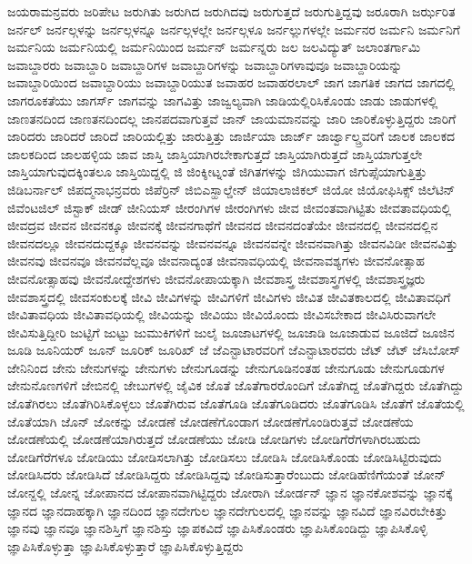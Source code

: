 {ಜಯರಾಮನ್ರವರು
ಜರಿಪೇಟ
ಜರುಗಿತು
ಜರುಗಿದ
ಜರುಗಿದವು
ಜರುಗುತ್ತದೆ
ಜರುಗುತ್ತಿದ್ದವು
ಜರೂರಾಗಿ
ಜರ್ಝರಿತ
ಜರ್ನಲ್
ಜರ್ನಲ್ಗಳನ್ನು
ಜರ್ನಲ್ಗಳನ್ನೂ
ಜರ್ನಲ್ಗಳಲ್ಲೇ
ಜರ್ನಲ್ಗಳೂ
ಜರ್ನಲ್ಲುಗಳಲ್ಲೇ
ಜರ್ಮನರ
ಜರ್ಮನಿ
ಜರ್ಮನಿಗೆ
ಜರ್ಮನಿಯ
ಜರ್ಮನಿಯಲ್ಲಿ
ಜರ್ಮನಿಯಿಂದ
ಜರ್ಮನ್
ಜರ್ಮನ್ನರು
ಜಲ
ಜಲವಿದ್ಯುತ್
ಜಲಾಂತರ್ಗಾಮಿ
ಜವಾಬ್ದಾರರು
ಜವಾಬ್ದಾರಿ
ಜವಾಬ್ದಾರಿಗಳ
ಜವಾಬ್ದಾರಿಗಳನ್ನು
ಜವಾಬ್ದಾರಿಗಳಾವುವೂ
ಜವಾಬ್ದಾರಿಯನ್ನು
ಜವಾಬ್ದಾರಿಯಿಂದ
ಜವಾಬ್ದಾರಿಯು
ಜವಾಬ್ದಾರಿಯುತ
ಜವಾಹರ
ಜವಾಹರಲಾಲ್
ಜಾಗ
ಜಾಗತಿಕ
ಜಾಗದ
ಜಾಗದಲ್ಲಿ
ಜಾಗರೂಕತೆಯು
ಜಾಗರ್ಸ್
ಜಾಗವನ್ನು
ಜಾಗವಿತ್ತು
ಜಾಜ್ವಲ್ಯವಾಗಿ
ಜಾಡಿಯಲ್ಲಿರಿಸಿಕೊಂಡು
ಜಾಡು
ಜಾಡುಗಳಲ್ಲಿ
ಜಾಣತನದಿಂದ
ಜಾಣತನದಿಂದಲ್ಲ
ಜಾನಪದವಾಗುತ್ತವೆ
ಜಾನ್
ಜಾಯಮಾನವನ್ನು
ಜಾರಿ
ಜಾರಿಕೊಳ್ಳುತ್ತಿದ್ದರು
ಜಾರಿಗೆ
ಜಾರಿದರು
ಜಾರಿದರೆ
ಜಾರಿದೆ
ಜಾರಿಯಲ್ಲಿತ್ತು
ಜಾರುತ್ತಿತ್ತು
ಜಾರ್ಜಿಯಾ
ಜಾರ್ಜ್
ಜಾರ್ಜ್ವಾಲ್ಡ್ರವರಿಗೆ
ಜಾಲಕ
ಜಾಲಕದ
ಜಾಲಕದಿಂದ
ಜಾಲಹಳ್ಳಿಯ
ಜಾವ
ಜಾಸ್ತಿ
ಜಾಸ್ತಿಯಾಗಿರಬೇಕಾಗುತ್ತದೆ
ಜಾಸ್ತಿಯಾಗಿರುತ್ತದೆ
ಜಾಸ್ತಿಯಾಗುತ್ತಲೇ
ಜಾಸ್ತಿಯಾಗುವುದಕ್ಕಿಂತಲೂ
ಜಾಸ್ತಿಯಿದ್ದಲ್ಲಿ
ಜಿ
ಜಿಂಕ್ಶೀಟ್ನಂತೆ
ಜಿಗಿತಗಳನ್ನು
ಜಿಗಿಯುವಾಗ
ಜಿಗುಪ್ಸೆಯಾಗುತ್ತಿತ್ತು
ಜಿಡಿಬರ್ನಾಲ್
ಜಿಪದ್ಮನಾಭನ್ರವರು
ಜಿಪೆರ್ರಿನ್
ಜಿಬಿಎಸ್ಹಾಲ್ಡೇನ್
ಜಿಯಾಲಾಜಿಕಲ್
ಜಿಯೋ
ಜಿಯೋಫಿಸಿಕ್ಸ್
ಜಿಲೆಟಿನ್
ಜಿವೆಂಟಜಿಲ್
ಜಿಸ್ಟಾಕ್
ಜೀಡ್
ಜೀನಿಯಸ್
ಜೀರಂಗಿಗಳ
ಜೀರಂಗಿಗಳು
ಜೀವ
ಜೀವಂತವಾಗಿಟ್ಟಿತು
ಜೀವತಾವಧಿಯಲ್ಲಿ
ಜೀವದ್ರವ
ಜೀವನ
ಜೀವನಕ್ಕೂ
ಜೀವನಕ್ಕೆ
ಜೀವನಗಾಥೆಗೆ
ಜೀವನದ
ಜೀವನದಂತೆಯೇ
ಜೀವನದಲ್ಲಿ
ಜೀವನದಲ್ಲಿನ
ಜೀವನದಲ್ಲೂ
ಜೀವನದುದ್ದಕ್ಕೂ
ಜೀವನವನ್ನು
ಜೀವನವನ್ನೂ
ಜೀವನವನ್ನೇ
ಜೀವನವಾಗಿತ್ತು
ಜೀವನವಿಡೀ
ಜೀವನವಿತ್ತು
ಜೀವನವು
ಜೀವನವೂ
ಜೀವನವೆಲ್ಲವೂ
ಜೀವನಾದ್ಯಂತ
ಜೀವನಾವಧಿಯಲ್ಲಿ
ಜೀವನಾವಶ್ಯಗಳು
ಜೀವನೋತ್ಸಾಹ
ಜೀವನೋತ್ಸಾಹವು
ಜೀವನೋದ್ದೇಶಗಳು
ಜೀವನೋಪಾಯಕ್ಕಾಗಿ
ಜೀವಶಾಸ್ತ್ರ
ಜೀವಶಾಸ್ತ್ರಗಳಲ್ಲಿ
ಜೀವಶಾಸ್ತ್ರಜ್ಞರು
ಜೀವಶಾಸ್ತ್ರದಲ್ಲಿ
ಜೀವಸಂಕುಲಕ್ಕೆ
ಜೀವಿ
ಜೀವಿಗಳನ್ನು
ಜೀವಿಗಳಿಗೆ
ಜೀವಿಗಳು
ಜೀವಿತ
ಜೀವಿತಕಾಲದಲ್ಲಿ
ಜೀವಿತಾವಧಿಗೆ
ಜೀವಿತಾವಧಿಯ
ಜೀವಿತಾವಧಿಯಲ್ಲಿ
ಜೀವಿಯನ್ನು
ಜೀವಿಯು
ಜೀವಿಯೊಂದು
ಜೀವಿಸಬೇಕಾದ
ಜೀವಿಸಿರುವಾಗಲೇ
ಜೀವಿಸುತ್ತಿದ್ದೀರಿ
ಜುಟ್ಟಿಗೆ
ಜುಟ್ಟು
ಜುಮುಕಿಗಳಿಗೆ
ಜುಲೈ
ಜೂಜಾಟಗಳಲ್ಲಿ
ಜೂಜಾಡಿ
ಜೂಜಾಡುವ
ಜೂಜಿದೆ
ಜೂಜಿನ
ಜೂಡಿ
ಜೂನಿಯರ್
ಜೂನ್
ಜೂರಿಕ್
ಜೂರಿಖ್
ಜೆ
ಜೆಎನ್ಟಾಟಾರವರಿಗೆ
ಜೆಎನ್ಟಾಟಾರವರು
ಜೆಟ್
ಜೆಟ್
ಜೆಸಿಬೋಸ್
ಜೇನಿನಿಂದ
ಜೇನು
ಜೇನುಗಳನ್ನು
ಜೇನುಗಳು
ಜೇನುಗೂಡನ್ನು
ಜೇನುಗೂಡಿನಂತಹ
ಜೇನುಗೂಡು
ಜೇನುಗೂಡುಗಳ
ಜೇನುನೊಣಗಳಿಗೆ
ಜೇಬಿನಲ್ಲಿ
ಜೇಬುಗಳಲ್ಲಿ
ಜೈವಿಕ
ಜೊತೆ
ಜೊತೆಗಾರರೊಂದಿಗೆ
ಜೊತೆಗಿದ್ದ
ಜೊತೆಗಿದ್ದರು
ಜೊತೆಗಿದ್ದು
ಜೊತೆಗಿರಲು
ಜೊತೆಗಿರಿಸಿಕೊಳ್ಳಲು
ಜೊತೆಗಿರುವ
ಜೊತೆಗೂಡಿ
ಜೊತೆಗೂಡಿದರು
ಜೊತೆಗೂಡಿಸಿ
ಜೊತೆಗೆ
ಜೊತೆಯಲ್ಲಿ
ಜೊತೆಯಾಗಿ
ಜೊನ್
ಜೋಕನ್ನು
ಜೋಡಣೆ
ಜೋಡಣೆಗೊಂಡಾಗ
ಜೋಡಣೆಗೊಂಡಿರುತ್ತವೆ
ಜೋಡಣೆಯ
ಜೋಡಣೆಯಲ್ಲಿ
ಜೋಡಣೆಯಾಗಿರುತ್ತದೆ
ಜೋಡಣೆಯು
ಜೋಡಿ
ಜೋಡಿಗಳು
ಜೋಡಿಗೆರೆಗಳಾಗಿರಬಹುದು
ಜೋಡಿಗೆರೆಗಳೂ
ಜೋಡಿಯು
ಜೋಡಿಸಲಾಗಿತ್ತು
ಜೋಡಿಸಲು
ಜೋಡಿಸಿ
ಜೋಡಿಸಿಕೊಂಡು
ಜೋಡಿಸಿಟ್ಟಿರುವುದು
ಜೋಡಿಸಿದರು
ಜೋಡಿಸಿದೆ
ಜೋಡಿಸಿದ್ದರು
ಜೋಡಿಸಿದ್ದವು
ಜೋಡಿಸುತ್ತಾರೆಂಬುದು
ಜೋಡಿಹೆಣಿಗೆಯಂತೆ
ಜೋನ್
ಜೋನ್ದಲ್ಲಿ
ಜೋನ್ನ
ಜೋಪಾನದ
ಜೋಪಾನವಾಗಿಟ್ಟಿದ್ದರು
ಜೋರಾಗಿ
ಜೋರ್ಡನ್
ಜ್ಞಾನ
ಜ್ಞಾನಕೋಶವನ್ನು
ಜ್ಞಾನಕ್ಕೆ
ಜ್ಞಾನದ
ಜ್ಞಾನದಾಹಕ್ಕಾಗಿ
ಜ್ಞಾನದಿಂದ
ಜ್ಞಾನದೇಗುಲ
ಜ್ಞಾನದೇಗುಲದಲ್ಲಿ
ಜ್ಞಾನವನ್ನು
ಜ್ಞಾನವಿದೆ
ಜ್ಞಾನವಿರಬೇಕಿತ್ತು
ಜ್ಞಾನವು
ಜ್ಞಾನವೂ
ಜ್ಞಾನಶಿಸ್ತಿಗೆ
ಜ್ಞಾನಶಿಸ್ತು
ಜ್ಞಾಪಕವಿದೆ
ಜ್ಞಾಪಿಸಿಕೊಂಡರು
ಜ್ಞಾಪಿಸಿಕೊಂಡಿದ್ದು
ಜ್ಞಾಪಿಸಿಕೊಳ್ಳಿ
ಜ್ಞಾಪಿಸಿಕೊಳ್ಳುತ್ತಾ
ಜ್ಞಾಪಿಸಿಕೊಳ್ಳುತ್ತಾರೆ
ಜ್ಞಾಪಿಸಿಕೊಳ್ಳುತ್ತಿದ್ದರು
}
